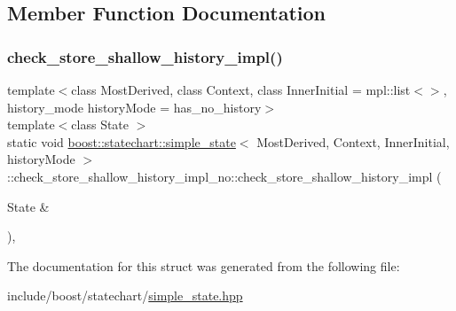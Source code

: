 \subsection{Member Function Documentation}
\mbox{\label{structboost_1_1statechart_1_1simple__state_1_1check__store__shallow__history__impl__no_a599618fe58206974a3a5829a90d272ed}} 
\subsubsection{\texorpdfstring{check\+\_\+store\+\_\+shallow\+\_\+history\+\_\+impl()}{check\_store\_shallow\_history\_impl()}}
{\footnotesize\ttfamily template$<$class Most\+Derived, class Context, class Inner\+Initial = mpl\+::list$<$$>$, history\+\_\+mode history\+Mode = has\+\_\+no\+\_\+history$>$ \\
template$<$class State $>$ \\
static void \mbox{\hyperlink{classboost_1_1statechart_1_1simple__state}{boost\+::statechart\+::simple\+\_\+state}}$<$ Most\+Derived, Context, Inner\+Initial, history\+Mode $>$\+::check\+\_\+store\+\_\+shallow\+\_\+history\+\_\+impl\+\_\+no\+::check\+\_\+store\+\_\+shallow\+\_\+history\+\_\+impl (\begin{DoxyParamCaption}\item[{State \&}]{ }\end{DoxyParamCaption})\hspace{0.3cm}{\ttfamily [inline]}, {\ttfamily [static]}}



The documentation for this struct was generated from the following file\+:\begin{DoxyCompactItemize}
\item 
include/boost/statechart/\mbox{\hyperlink{simple__state_8hpp}{simple\+\_\+state.\+hpp}}\end{DoxyCompactItemize}
